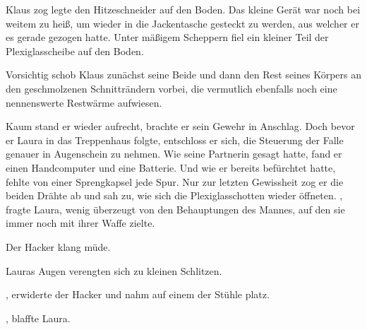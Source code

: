 Klaus zog legte den Hitzeschneider auf den Boden. Das kleine Gerät war noch bei weitem zu heiß, um wieder in die Jackentasche gesteckt zu werden, aus welcher er es gerade gezogen hatte. Unter mäßigem Scheppern fiel ein kleiner Teil der Plexiglasscheibe auf den Boden.

\par

Vorsichtig schob Klaus zunächst seine Beide und dann den Rest seines Körpers an den geschmolzenen Schnitträndern vorbei, die vermutlich ebenfalls noch eine nennenswerte Restwärme aufwiesen.

\par

Kaum stand er wieder aufrecht, brachte er sein Gewehr in Anschlag. Doch bevor er Laura in das Treppenhaus folgte, entschloss er sich, die Steuerung der Falle genauer in Augenschein zu nehmen. Wie seine Partnerin gesagt hatte, fand er einen Handcomputer und eine Batterie. Und wie er bereits befürchtet hatte, fehlte von einer Sprengkapsel jede Spur. Nur zur letzten Gewissheit zog er die beiden Drähte ab und sah zu, wie sich die Plexiglasschotten wieder öffneten.
\ortswechsel
{}, fragte Laura, wenig überzeugt von den Behauptungen des Mannes, auf den sie immer noch mit ihrer Waffe zielte.

\par

 Der Hacker klang müde. 

\par

Lauras Augen verengten sich zu kleinen Schlitzen. 

\par

, erwiderte der Hacker und nahm auf einem der Stühle platz. 

\par

, blaffte Laura. 

